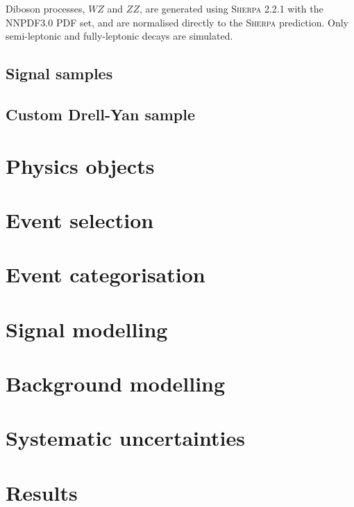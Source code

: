 Diboson processes, $WZ$ and $ZZ$, are generated using
\textsc{Sherpa} 2.2.1 with the NNPDF3.0 PDF set, and are normalised
directly to the \textsc{Sherpa} prediction. Only semi-leptonic
and fully-leptonic decays are simulated.

\subsection{Signal samples}

\subsection{Custom Drell-Yan sample}


\section{Physics objects}

\section{Event selection}

\section{Event categorisation}

\section{Signal modelling}

\section{Background modelling}

\section{Systematic uncertainties}

\section{Results}


